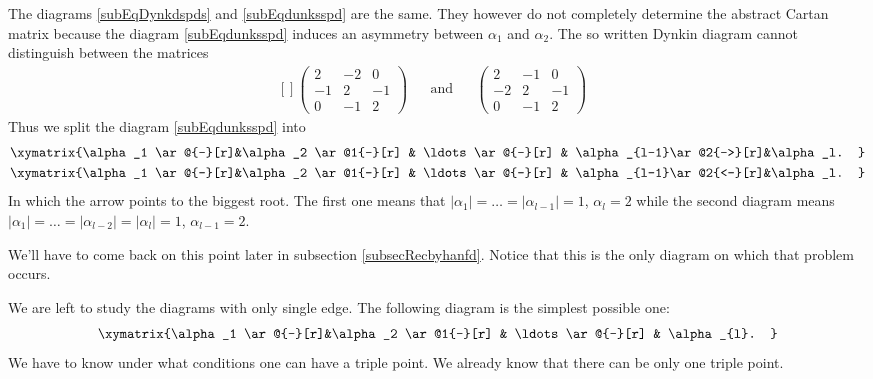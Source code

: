 The diagrams \eqref{subEqDynkdspds} and \eqref{subEqdunksspd} are the same. They however do not completely determine the abstract Cartan matrix because the diagram \eqref{subEqdunksspd} induces an asymmetry between \( \alpha_1\) and \( \alpha_2\). The so written Dynkin diagram cannot distinguish between the matrices
\begin{equation}
    \begin{aligned}[]
        \begin{pmatrix}
            2    &   -2    &   0    \\
            -1    &   2    &   -1    \\
            0    &   -1    &   2
        \end{pmatrix}&&
        \text{and}&&
        \begin{pmatrix}
            2    &   -1    &   0    \\
            -2    &   2    &   -1    \\
            0    &   -1    &   2
        \end{pmatrix}&
    \end{aligned}
\end{equation}
Thus we split the diagram \eqref{subEqdunksspd} into
\begin{subequations}        \label{suBeqdfynkabGP}
    \begin{align}
    \xymatrix{%
    \alpha_1 \ar@{-}[r]&\alpha_2  \ar@1{-}[r]   & \ldots \ar@{-}[r] & \alpha_{l-1}\ar@2{->}[r]&\alpha_l.
    }   \\
    \xymatrix{%
    \alpha_1 \ar@{-}[r]&\alpha_2  \ar@1{-}[r]   & \ldots \ar@{-}[r] & \alpha_{l-1}\ar@2{<-}[r]&\alpha_l.
    }    
    \end{align}
\end{subequations}
In which the arrow points to the biggest root. The first one means that \( | \alpha_1 |=\ldots=| \alpha_{l-1} |=1\), \( \alpha_{l}=2\) while the second diagram means \( | \alpha_1 |=\ldots=| \alpha_{l-2} |=| \alpha_l |=1\), \( \alpha_{l-1}=2\).

We'll have to come back on this point later in subsection \ref{subsecRecbyhanfd}. Notice that this is the only diagram on which that problem occurs.

We are left to study the diagrams with only single edge. The following diagram is the simplest possible one:
\begin{equation}
    \xymatrix{%
    \alpha_1 \ar@{-}[r]&\alpha_2  \ar@1{-}[r]   & \ldots \ar@{-}[r] & \alpha_{l}.
       }
\end{equation}
We have to know under what conditions one can have a triple point. We already know that there can be only one triple point.

